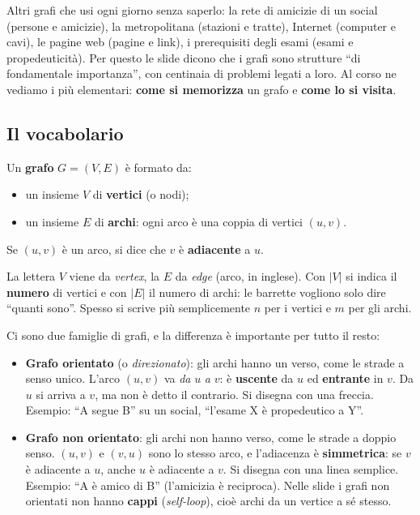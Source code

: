 Altri grafi che usi ogni giorno senza saperlo: la rete di amicizie di un social (persone
e amicizie), la metropolitana (stazioni e tratte), Internet (computer e cavi), le pagine
web (pagine e link), i prerequisiti degli esami (esami e propedeuticità). Per questo le
slide dicono che i grafi sono strutture ``di fondamentale importanza'', con centinaia di
problemi legati a loro. Al corso ne vediamo i più elementari: \textbf{come si memorizza}
un grafo e \textbf{come lo si visita}.

\subsection*{Il vocabolario}

\begin{definizione}[: grafo]
Un \textbf{grafo} $G = (V, E)$ è formato da:
\begin{itemize}
  \item un insieme $V$ di \textbf{vertici} (o nodi);
  \item un insieme $E$ di \textbf{archi}: ogni arco è una coppia di vertici $(u, v)$.
\end{itemize}
Se $(u, v)$ è un arco, si dice che $v$ è \textbf{adiacente} a $u$.
\end{definizione}

La lettera $V$ viene da \emph{vertex}, la $E$ da \emph{edge} (arco, in inglese). Con
$|V|$ si indica il \textbf{numero} di vertici e con $|E|$ il numero di archi: le
barrette vogliono solo dire ``quanti sono''. Spesso si scrive più semplicemente $n$ per
i vertici e $m$ per gli archi.

Ci sono due famiglie di grafi, e la differenza è importante per tutto il resto:
\begin{itemize}
  \item \textbf{Grafo orientato} (o \emph{direzionato}): gli archi hanno un verso, come
        le strade a senso unico. L'arco $(u, v)$ va \emph{da} $u$ \emph{a} $v$: è
        \textbf{uscente} da $u$ ed \textbf{entrante} in $v$. Da $u$ si arriva a $v$, ma
        non è detto il contrario. Si disegna con una freccia. Esempio: ``A segue B'' su un
        social, ``l'esame X è propedeutico a Y''.
  \item \textbf{Grafo non orientato}: gli archi non hanno verso, come le strade a doppio
        senso. $(u, v)$ e $(v, u)$ sono lo stesso arco, e l'adiacenza è
        \textbf{simmetrica}: se $v$ è adiacente a $u$, anche $u$ è adiacente a $v$. Si
        disegna con una linea semplice. Esempio: ``A è amico di B'' (l'amicizia è
        reciproca). Nelle slide i grafi non orientati non hanno \textbf{cappi}
        (\emph{self-loop}), cioè archi da un vertice a sé stesso.
\end{itemize}

